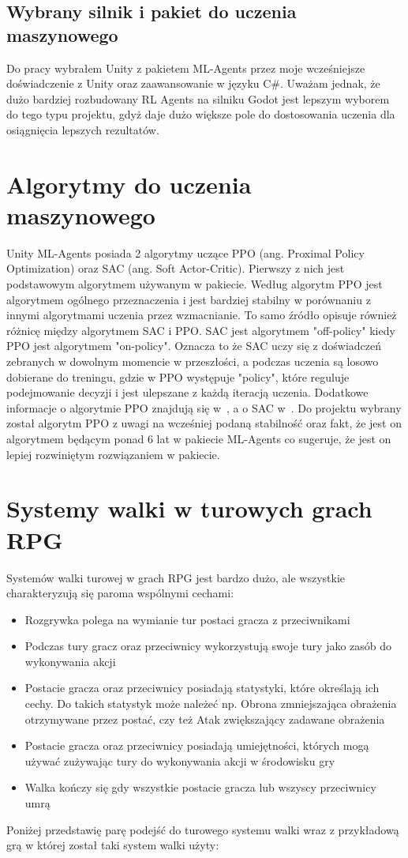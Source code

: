\documentclass{SGGW-thesis}
\begin{document}
\subsection*{Wybrany silnik i pakiet do uczenia maszynowego}
Do pracy wybrałem Unity z pakietem ML-Agents przez moje wcześniejsze doświadczenie z Unity oraz zaawansowanie w języku C\#. Uważam jednak, że dużo bardziej rozbudowany RL Agents na silniku Godot jest lepszym wyborem do tego typu projektu, gdyż daje dużo większe pole do dostosowania uczenia dla osiągnięcia lepszych rezultatów.


\section{Algorytmy do uczenia maszynowego}
\label{algorithms}
Unity ML-Agents posiada 2 algorytmy uczące PPO (ang. Proximal Policy Optimization) oraz SAC (ang. Soft Actor-Critic). Pierwszy z nich jest podstawowym algorytmem używanym w pakiecie. Według \cite{MLAgentsDocs} algorytm PPO jest algorytmem ogólnego przeznaczenia i jest bardziej stabilny w porównaniu z innymi algorytmami uczenia przez wzmacnianie.
To samo źródło opisuje również różnicę między algorytmem SAC i PPO. SAC jest algorytmem "off-policy" kiedy PPO jest algorytmem "on-policy". Oznacza to że SAC uczy się z doświadczeń zebranych w dowolnym momencie w przeszłości, a podczas uczenia są losowo dobierane do treningu, gdzie w PPO występuje "policy",
które reguluje podejmowanie decyzji i jest ulepszane z każdą iteracją uczenia. Dodatkowe informacje o algorytmie PPO znajdują się w~\cite{PPOArticle}, a o SAC w~\cite{SACArticle}. Do projektu wybrany został algorytm PPO z uwagi na wcześniej podaną stabilność oraz fakt, że jest on algorytmem będącym ponad 6 lat w pakiecie ML-Agents co sugeruje, że jest on lepiej rozwiniętym rozwiązaniem w pakiecie.

\section{Systemy walki w turowych grach RPG}
Systemów walki turowej w grach RPG jest bardzo dużo, ale wszystkie charakteryzują się paroma wspólnymi cechami:
\begin{itemize}
  \item{Rozgrywka polega na wymianie tur postaci gracza z przeciwnikami}
  \item{Podczas tury gracz oraz przeciwnicy wykorzystują swoje tury jako zasób do wykonywania akcji}
  \item{Postacie gracza oraz przeciwnicy posiadają statystyki, które określają ich cechy. Do takich statystyk może należeć np. Obrona zmniejszająca obrażenia otrzymywane przez postać, czy też Atak zwiększający zadawane obrażenia}
  \item{Postacie gracza oraz przeciwnicy posiadają umiejętności, których mogą używać zużywając tury do wykonywania akcji w środowisku gry}
  \item{Walka kończy się gdy wszystkie postacie gracza lub wszyscy przeciwnicy umrą}
\end{itemize}
Poniżej przedstawię parę podejść do turowego systemu walki wraz z przykładową grą w której został taki system walki użyty:
\end{document}

